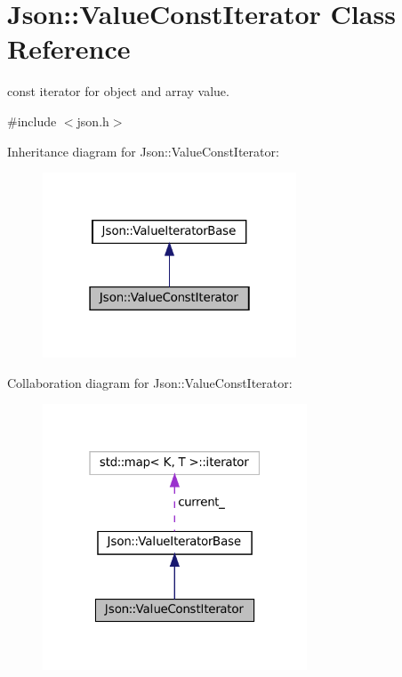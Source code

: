 \hypertarget{classJson_1_1ValueConstIterator}{}\section{Json\+:\+:Value\+Const\+Iterator Class Reference}
\label{classJson_1_1ValueConstIterator}


const iterator for object and array value.  




{\ttfamily \#include $<$json.\+h$>$}



Inheritance diagram for Json\+:\+:Value\+Const\+Iterator\+:
\nopagebreak
\begin{figure}[H]
\begin{center}
\leavevmode
\includegraphics[width=214pt]{classJson_1_1ValueConstIterator__inherit__graph}
\end{center}
\end{figure}


Collaboration diagram for Json\+:\+:Value\+Const\+Iterator\+:
\nopagebreak
\begin{figure}[H]
\begin{center}
\leavevmode
\includegraphics[width=223pt]{classJson_1_1ValueConstIterator__coll__graph}
\end{center}
\end{figure}
